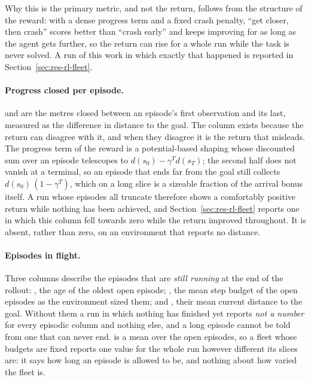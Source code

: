 Why this is the primary metric, and not the return, follows from the structure
of the reward: with a dense progress term and a fixed crash penalty, ``get
closer, then crash'' scores better than ``crash early'' and keeps improving for
as long as the agent gets further, so the return can rise for a whole run while
the task is never solved. A run of this work in which exactly that happened is
reported in Section~\ref{sec:res-rl-fleet}.

\paragraph{Progress closed per episode.}
 and  are the metres closed
between an episode's first observation and its last, measured as the
difference in distance to the goal. The column exists because the return can
disagree with it, and when they disagree it is the return that misleads. The
progress term of the reward is a potential-based shaping
\cite{ng1999policy} whose discounted sum over an episode telescopes to
$d(s_0) - \gamma^{T} d(s_T)$; the second half does not vanish at a terminal,
so an episode that ends far from the goal still collects
$d(s_0)\,(1 - \gamma^{T})$, which on a long slice is a sizeable fraction of the
arrival bonus itself. A run whose episodes all truncate therefore shows a
comfortably positive return while nothing has been achieved, and
Section~\ref{sec:res-rl-fleet} reports one in which this column fell towards
zero while the return improved throughout. It is absent, rather than zero, on an
environment that reports no distance.

\paragraph{Episodes in flight.}
Three columns describe the episodes that are \emph{still running} at the end
of the rollout: , the age of the oldest open episode;
, the mean step budget of the open episodes as the
environment sized them; and , their mean current distance
to the goal. Without them a run in which nothing has finished yet reports
\emph{not a number} for every episodic column and nothing else, and a long
episode cannot be told from one that can never end.  is a
mean over the open episodes, so a fleet whose budgets are fixed reports one
value for the whole run however different its slices are: it says how long an
episode is allowed to be, and nothing about how varied the fleet is.

